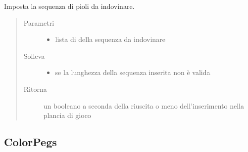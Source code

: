 \documentclass[letterpaper,10pt,italian,openany,oneside]{sphinxmanual}
\begin{document}
\begin{fulllineitems}
\label{\detokenize{test/it/unicam/cs/pa/mastermind/gamecore/BoardModel:it.unicam.cs.pa.mastermind.gamecore.BoardModel.setSequenceToGuess(List)}}
Imposta la sequenza di pioli da indovinare.
\begin{quote}\begin{description}
\item[{Parametri}] \leavevmode\begin{itemize}
\item {} 
 \textendash{} lista di  della sequenza da indovinare

\end{itemize}

\item[{Solleva}] \leavevmode\begin{itemize}
\item {} 
 \textendash{} se la lunghezza della sequenza inserita non è valida

\end{itemize}

\item[{Ritorna}] \leavevmode
un booleano a seconda della riuscita o meno dell’inserimento nella plancia di gioco

\end{description}\end{quote}

\end{fulllineitems}



\subsection{ColorPegs}
\label{\detokenize{test/it/unicam/cs/pa/mastermind/gamecore/ColorPegs:colorpegs}}\label{\detokenize{test/it/unicam/cs/pa/mastermind/gamecore/ColorPegs::doc}}
\end{document}
